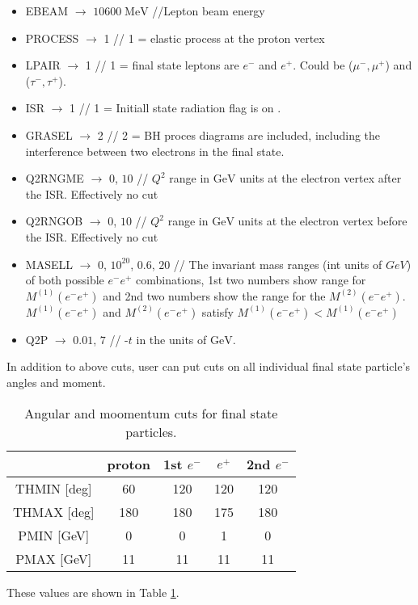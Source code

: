 \documentclass[letterpaper,12pt]{article}
\def \rarr {\rightarrow}
\begin{document}
 \begin{itemize}
  \item EBEAM   $\rarr$   $\mathrm{10600\; MeV}$  //Lepton beam energy
  \item PROCESS	$\rarr$	1 // 1 = elastic process at the proton vertex
  \item LPAIR	$\rarr$	1 // 1 = final state leptons are $e^{-}$ and $e^{+}$. Could be ($\mu^{-},\mu^{+}$) and ($\tau^{-},\tau^{+}$).
  \item ISR 	$\rarr$ 1 // 1 = Initiall state radiation flag is on .
  \item GRASEL  $\rarr$ 2 // 2 = BH proces diagrams are included, including the interference between two electrons in the final state.
  \item Q2RNGME $\rarr$ $0$, $10$ // $Q^{2}$ range in $\mathrm{GeV}$ units at the electron vertex after the ISR.   Effectively no cut
  \item Q2RNGOB $\rarr$ $0$, $10$ // $Q^{2}$ range in $\mathrm{GeV}$ units at the electron vertex before the ISR.   Effectively no cut
  \item MASELL  $\rarr$ $0$, $10^{20}$, $0.6$, $20$ // The invariant mass ranges (int units of $GeV$) of both possible $e^{-}e^{+}$ combinations, 1st two numbers show range for $M^{(1)}(e^{-}e^{+})$ and 2nd two numbers
  show the range for the $M^{(2)}(e^{-}e^{+})$. $M^{(1)}(e^{-}e^{+})$ and $M^{(2)}(e^{-}e^{+})$ satisfy $M^{(1)}(e^{-}e^{+}) < M^{(1)}(e^{-}e^{+})$
  \item Q2P	$\rarr$ $0.01$, $7$ // -$t$ in the units of $\mathrm{GeV}$.
 \end{itemize}

 In addition to above cuts, user can put cuts on all individual final state particle's angles and moment.
 \begin{table}[!htb]
 \centering
 \begin{tabular}{|c|c|c|c|c|}
 \hline
		& proton & 1st $e^{-}$ 	& $e^{+}$ & 2nd $e^{-}$ \\ \hline
  THMIN [deg]	& 60	 & 120		& 120	  & 120		\\ \hline
  THMAX [deg]	& 180	 & 180		& 175	  & 180		\\ \hline
  PMIN  [GeV]	& 0	 & 0		& 1	  & 0 		\\ \hline
  PMAX  [GeV]	& 11	 & 11		& 11	  & 11 		\\ \hline
 \end{tabular}
\caption{Angular and moomentum cuts for final state particles.}
  \label{tb:mom_angle_cuts}
 \end{table}
 These values are shown in Table \ref{tb:mom_angle_cuts}.
 
\end{document}
